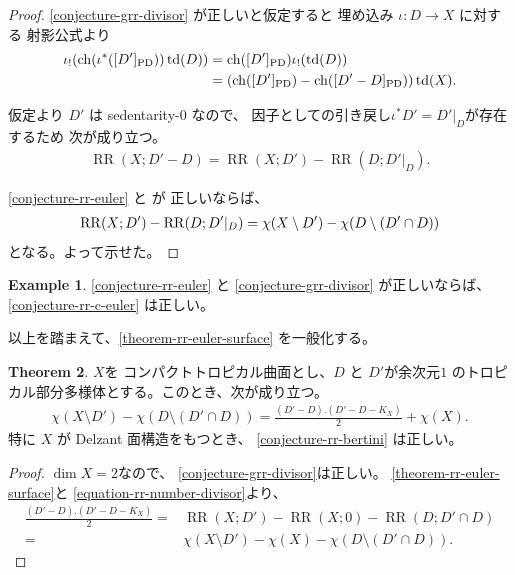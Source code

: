 \documentclass[a4paper,dvipdfmx,reqno,12pt]{amsart}
\theoremstyle{definition}
\newtheorem{theorem}{Theorem}[section]
\newtheorem{example}[theorem]{Example}
\newcommand{\opn}[1]{\operatorname{#1}}
\newcommand{\PD}[1]{[#1]_{\mathrm{PD}}}
\numberwithin{equation}{section}
\begin{document}
\begin{proof}
\cref{conjecture-grr-divisor} が正しいと仮定すると
埋め込み $\iota\colon D\to X$ に対する
射影公式より
\begin{align}
\iota_!(\opn{ch}(\iota^{*}(\PD{D'}))\opn{td}(D))
&=\opn{ch}(\PD{D'})\iota_!(\opn{td}(D)) \notag \\
&=(\opn{ch}(\PD{D'})-\opn{ch}(\PD{D'-D}))\opn{td}(X).
\end{align}

仮定より $D'$ は sedentarity-$0$ なので、
因子としての引き戻し$\iota^{*}D'=D'|_{D}$が存在するため
次が成り立つ。
\begin{align}
\label{equation-rr-number-divisor}
\opn{RR}(X;D'-D)=\opn{RR}(X;D')-
\opn{RR}(D;D'|_{D}).
\end{align}

\cref{conjecture-rr-euler} と
\cite[Conjecture 6.13]{demedrano2023chern} が
正しいならば、
\begin{align}
\opn{RR}(X;D')-
\opn{RR}(D;D'|_{D})=
\chi(X\setminus D')-\chi(D\setminus (D'\cap D)) \notag
\end{align}
となる。よって示せた。
\end{proof}

\begin{example}
\cref{conjecture-rr-euler} と
\cref{conjecture-grr-divisor} が正しいならば、
\cref{conjecture-rr-c-euler} は正しい。
\end{example}

以上を踏まえて、\cref{theorem-rr-euler-surface}
を一般化する。

\begin{theorem}
\label{theorem-rr-bertini-surface}
$X$を
コンパクトトロピカル曲面とし、$D$ と $D'$が余次元$1$
のトロピカル部分多様体とする。このとき、次が成り立つ。
\begin{align}
\chi(X\setminus D')-\chi(D\setminus (D'\cap D))
=\frac{(D'-D).(D'-D-K_X)}{2}+\chi(X).
\end{align}
特に $X$ が Delzant 面構造をもつとき、
\cref{conjecture-rr-bertini} は正しい。
\end{theorem}

\begin{proof}
$\dim X=2$なので、
\cref{conjecture-grr-divisor}は正しい。
\cref{theorem-rr-euler-surface}と
\eqref{equation-rr-number-divisor}より、
\begin{align}
\frac{(D'-D).(D'-D-K_X)}{2}=&
\opn{RR}(X;D')-\opn{RR}(X;0)-
\opn{RR}(D;D'\cap D) \\
=&\chi(X\setminus D')-\chi(X)-\chi(D\setminus (D'\cap D)).
\end{align}
\end{proof}
\end{document}
